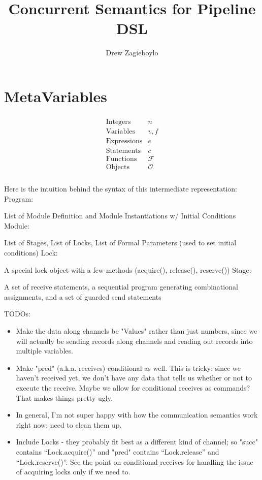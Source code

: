 \documentclass{article}
\begin{document}
\title{Concurrent Semantics for Pipeline DSL}
\author{Drew Zagieboylo}
\maketitle

\section{MetaVariables}
\begin{align*}
  \begin{array}{lc}
    \mbox{Integers} & n \\
    \mbox{Variables} & v,f\\
    \mbox{Expressions} & e\\
    \mbox{Statements} & c\\
    \mbox{Functions} & \mathcal{F}\\
    \mbox{Objects} & \mathcal{O}\\
  \end{array}
\end{align*}

Here is the intuition behind the syntax of this intermediate representation:\newline
Program:

List of Module Definition and Module Instantiations w/ Initial Conditions\newline
Module:

List of Stages, List of Locks, List of Formal Parameters (used to set initial conditions)\newline
Lock:

A special lock object with a few methods (acquire(), release(), reserve())\newline
Stage:

A set of receive statements, a sequential program generating combinational assignments,
and a set of guarded send statements\newline

TODOs:
\begin{itemize}
\item Make the data along channels be "Values" rather than just numbers, since 
we will actually be sending records along channels and reading out records into multiple variables.
\item Make "pred" (a.k.a. receives) conditional as well. This is tricky; since we haven't
received yet, we don't have any data that tells us whether or not to execute the receive.
Maybe we allow for conditional receives as commands? That makes things pretty ugly.
\item In general, I'm not super happy with how the communication semantics work right now;
need to clean them up.
\item Include Locks - they probably fit best as a different kind of channel;
so "succ" contains ``Lock.acquire()'' and "pred" contains ``Lock.release'' and
``Lock.reserve()''. See the point on conditional receives for handling the issue
of acquiring locks only if we need to.
\end{itemize}
\end{document}
